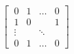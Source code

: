 \documentclass[preview]{standalone}
\begin{document}
\begin{align*}
\begin{bmatrix}\
                      0 & 1 & \dots & 0 \\\
                      1 & 0 &       & 1 \\\
                      \vdots & & \ddots\\\
                      0 & 1 & \dots & 0  \end{bmatrix}
\end{align*}
\end{document}
